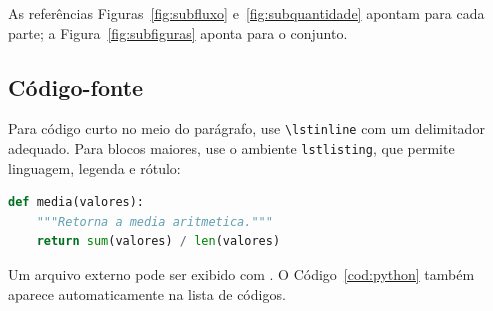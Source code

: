 As referências Figuras~\ref{fig:subfluxo} e~\ref{fig:subquantidade} apontam para cada parte; a Figura~\ref{fig:subfiguras} aponta para o conjunto.

\subsection{Código-fonte}

Para código curto no meio do parágrafo, use \lstinline|\lstinline| com um delimitador adequado. Para blocos maiores, use o ambiente \texttt{lstlisting}, que permite linguagem, legenda e rótulo:

\begin{lstlisting}[language=Python,caption={Função simples em Python},label={cod:python}]
def media(valores):
    """Retorna a media aritmetica."""
    return sum(valores) / len(valores)
\end{lstlisting}

Um arquivo externo pode ser exibido com \lstinline||. O Código~\ref{cod:python} também aparece automaticamente na lista de códigos.

